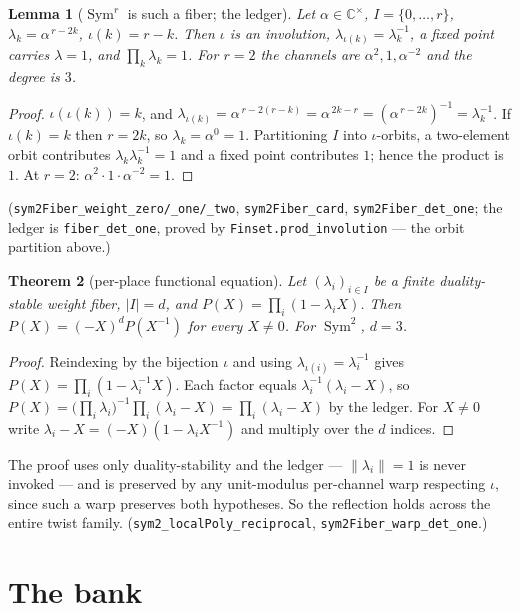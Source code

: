 \documentclass[11pt]{article}
\newtheorem{theorem}{Theorem}
\newtheorem{lemma}[theorem]{Lemma}
\newcommand{\Sym}{\operatorname{Sym}}
\begin{document}
\begin{lemma}[$\Sym^r$ is such a fiber; the ledger]\label{lem:ledger}
Let $\alpha\in\mathbb C^\times$, $I=\{0,\dots,r\}$, $\lambda_k=\alpha^{\,r-2k}$, $\iota(k)=r-k$.
Then $\iota$ is an involution, $\lambda_{\iota(k)}=\lambda_k^{-1}$, a fixed point carries
$\lambda=1$, and $\prod_k\lambda_k=1$. For $r=2$ the channels are $\alpha^{2},1,\alpha^{-2}$ and
the degree is $3$.
\end{lemma}
\begin{proof}
$\iota(\iota(k))=k$, and
$\lambda_{\iota(k)}=\alpha^{\,r-2(r-k)}=\alpha^{\,2k-r}=(\alpha^{\,r-2k})^{-1}=\lambda_k^{-1}$.
If $\iota(k)=k$ then $r=2k$, so $\lambda_k=\alpha^0=1$. Partitioning $I$ into $\iota$-orbits, a
two-element orbit contributes $\lambda_k\lambda_k^{-1}=1$ and a fixed point contributes $1$; hence
the product is $1$. At $r=2$: $\alpha^2\cdot1\cdot\alpha^{-2}=1$.
\end{proof}

(\texttt{sym2Fiber\_weight\_zero/\_one/\_two}, \texttt{sym2Fiber\_card},
\texttt{sym2Fiber\_det\_one}; the ledger is \texttt{fiber\_det\_one}, proved by
\texttt{Finset.prod\_involution} --- the orbit partition above.)

\begin{theorem}[per-place functional equation]\label{thm:localFE}
Let $(\lambda_i)_{i\in I}$ be a finite duality-stable weight fiber, $|I|=d$, and
$P(X)=\prod_i(1-\lambda_iX)$. Then $P(X)=(-X)^{d}P(X^{-1})$ for every $X\ne0$. For $\Sym^2$,
$d=3$.
\end{theorem}
\begin{proof}
Reindexing by the bijection $\iota$ and using $\lambda_{\iota(i)}=\lambda_i^{-1}$ gives
$P(X)=\prod_i(1-\lambda_i^{-1}X)$. Each factor equals $\lambda_i^{-1}(\lambda_i-X)$, so
$P(X)=\bigl(\prod_i\lambda_i\bigr)^{-1}\prod_i(\lambda_i-X)=\prod_i(\lambda_i-X)$ by the ledger.
For $X\ne0$ write $\lambda_i-X=(-X)(1-\lambda_iX^{-1})$ and multiply over the $d$ indices.
\end{proof}

The proof uses only duality-stability and the ledger --- $\|\lambda_i\|=1$ is never invoked --- and
is preserved by any unit-modulus per-channel warp respecting $\iota$, since such a warp preserves
both hypotheses. So the reflection holds across the entire twist family.
(\texttt{sym2\_localPoly\_reciprocal}, \texttt{sym2Fiber\_warp\_det\_one}.)

\section{The bank}
\end{document}
